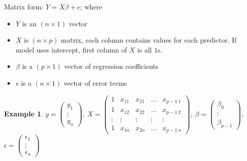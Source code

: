 \documentclass[a4paper,11pt]{article}
\newtheorem{eg}[thm]{Example}
\begin{document}
Matrix form: $Y=X\beta+\epsilon$; where
\begin{itemize}
\item $Y$ is an $(n\times 1)$ vector
\item $X$ is $(n\times p)$ matrix, each column contains values for each predictor. If model uses intercept, first column of $X$ is all $1$s. 
\item $\beta$ is a $(p\times 1)$ vector of regression coefficients
\item $\epsilon$ is a $(n\times 1)$ vector of error terms
\end{itemize}
\begin{eg}
$y=\begin{pmatrix}
y_1\\
\vdots\\
y_n
\end{pmatrix}$, 
$X=\begin{pmatrix}
1 & x_{11} & x_{21} & ... & x_{p-1\ 1}\\
1 & x_{12} & x_{22} & ... & x_{p-1\ 2}\\
\vdots & \vdots & \vdots & \vdots & \vdots\\
1 & x_{1n} & x_{2n} & ... & x_{p-1\ n}
\end{pmatrix}$, 
$\beta=\begin{pmatrix}
\beta_0\\
\vdots\\
\beta_{p-1}
\end{pmatrix}$, 
$\epsilon=\begin{pmatrix}
\epsilon_1\\
\vdots\\
\epsilon_n
\end{pmatrix}$
\end{eg}
\end{document}
